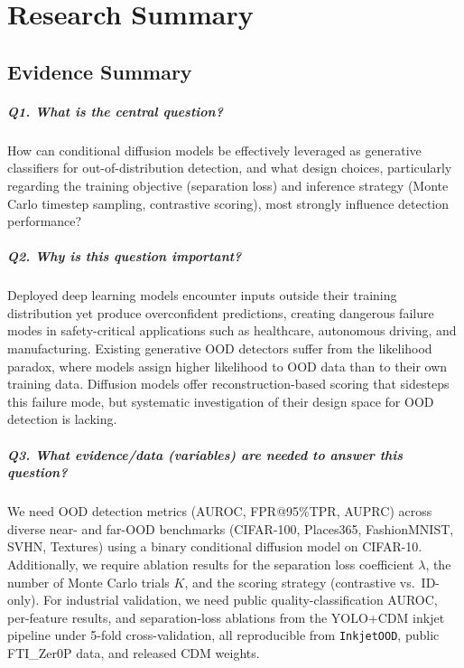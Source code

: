 \chapter{Research Summary}
\label{app:story-summary}

\section{Evidence Summary}
\label{app:story-summary:points}

\paragraph{Q1. What is the central question?}
How can conditional diffusion models be effectively leveraged as generative classifiers for out-of-distribution detection, and what design choices, particularly regarding the training objective (separation loss) and inference strategy (Monte Carlo timestep sampling, contrastive scoring), most strongly influence detection performance?

\paragraph{Q2. Why is this question important?}
Deployed deep learning models encounter inputs outside their training distribution yet produce overconfident predictions, creating dangerous failure modes in safety-critical applications such as healthcare, autonomous driving, and manufacturing. Existing generative OOD detectors suffer from the likelihood paradox, where models assign higher likelihood to OOD data than to their own training data. Diffusion models offer reconstruction-based scoring that sidesteps this failure mode, but systematic investigation of their design space for OOD detection is lacking.

\paragraph{Q3. What evidence/data (variables) are needed to answer this question?}
We need OOD detection metrics (AUROC, FPR@95\%TPR, AUPRC) across diverse near- and far-OOD benchmarks (CIFAR-100, Places365, FashionMNIST, SVHN, Textures) using a binary conditional diffusion model on CIFAR-10. Additionally, we require ablation results for the separation loss coefficient $\lambda$, the number of Monte Carlo trials $K$, and the scoring strategy (contrastive vs.\ ID-only). For industrial validation, we need public quality-classification AUROC, per-feature results, and separation-loss ablations from the YOLO+CDM inkjet pipeline under 5-fold cross-validation, all reproducible from \texttt{InkjetOOD}, public FTI\_Zer0P data, and released CDM weights.


